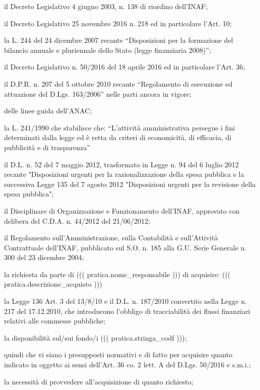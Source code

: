 \documentclass[a4paper,12pt]{letter}
\begin{document}
\begin{list}{VALUTATA}{}
\item[VISTO] il Decreto Legislativo 4 giugno 2003, n. 138 di riordino dell'INAF;
\item[VISTO] il Decreto Legislativo 25 novembre 2016 n. 218 ed in particolare l'Art. 10;
\item[VISTA] la L. 244 del 24 dicembre 2007 recante ``Disposizioni per la formazione 
        del bilancio annuale e pluriennale dello Stato (legge finanziaria 2008)''; 
\item[VISTO]  il Decreto Legislativo n. 50/2016 del 18 aprile 2016 ed in particolare
      l'Art. 36;
\item[VISTO] il D.P.R. n. 207 del 5 ottobre 2010 recante ``Regolamento di esecuzione 
        ed attuazione del D.Lgs. 163/2006'' nelle parti ancora in vigore; 
\item[PRESO ATTO] delle linee guida dell'ANAC;
\item[VISTA] la L. 241/1990 che stabilisce che: ``L'attività amministrativa persegue i 
        fini determinati dalla legge ed è retta da criteri di economicità, di 
        efficacia, di pubblicità e di trasparenza''
\item[VISTO] il D.L. n. 52 del 7 maggio 2012, trasformato in Legge n. 94 del 6 luglio 2012 
        recante "Disposizioni urgenti per la razionalizzazione della spesa pubblica 
        e la successiva Legge 135 del 7 agosto 2012 "Disposizioni urgenti per la 
        revisione della spesa pubblica"; 
\item[VISTO] il Disciplinare di Organizzazione e Funzionamento dell'INAF, approvato
        con delibera del C.D.A. n. 44/2012 del 21/06/2012;
\item[VISTO] il Regolamento sull'Amministrazione, sulla Contabilità e sull'Attività 
        Contrattuale dell'INAF, pubblicato sul S.O. n. 185 alla G.U. Serie Generale 
        n. 300 del 23 dicembre 2004;   
\item[VISTA] la richiesta da parte di ((( pratica.nome_responsabile ))) di  acquisire:
         ((( pratica.descrizione_acquisto ))) \\
\item[VISTA] la Legge 136 Art. 3 del 13/8/10 e il D.L. n. 187/2010 convertito nella Legge 
        n. 217 del 17.12.2010, che introducono l'obbligo di tracciabilità dei flussi 
        finanziari relativi alle commesse pubbliche; 
\item[VISTA] la disponibilità sul/sui fondo/i ((( pratica.stringa_codf ))); 
\item[RITENUTO] quindi che vi siano i presupposti normativi e di fatto per acquisire  
         quanto indicato in oggetto ai sensi dell'Art. 36 co. 2 lett. A del D.Lgs. 50/2016 e s.m.i.;
\item[VALUTATA] la necessità di provvedere all'acquisizione di quanto richiesto; 
\end{list}
\end{document}
